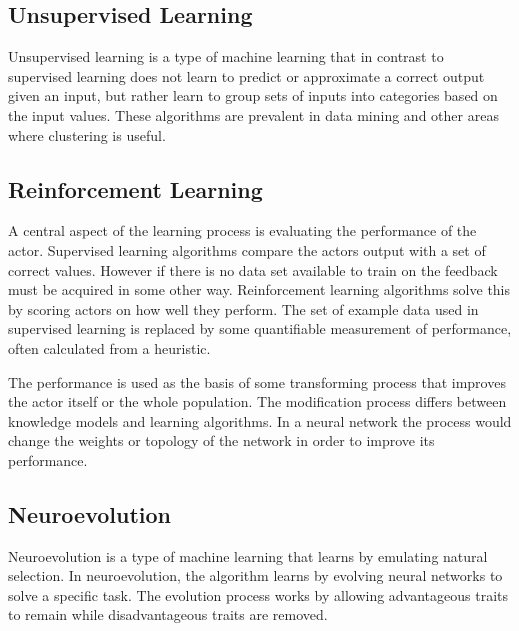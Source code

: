 
\subsection{Unsupervised Learning}
Unsupervised learning is a type of machine learning that in contrast to supervised learning does not learn to predict or approximate a correct output given an input, but rather learn to group sets of inputs into categories based on the input values. These algorithms are prevalent in data mining and other areas where clustering is useful. 

\subsection{Reinforcement Learning}
A central aspect of the learning process is evaluating the performance of the actor. Supervised learning algorithms compare the actors output with a set of correct values. However if there is no data set available to train on the feedback must be acquired in some other way. Reinforcement learning algorithms solve this by scoring actors on how well they perform. The set of example data used in supervised learning is replaced by some quantifiable measurement of performance, often calculated from a heuristic. 

The performance is used as the basis of some transforming process that improves the actor itself or the whole population. The modification process differs between knowledge models and learning algorithms. In a neural network the process would change the weights or topology of the network in order to improve its performance.

\subsection{Neuroevolution}
Neuroevolution is a type of machine learning that learns by emulating natural selection. In neuroevolution, the algorithm learns by evolving neural networks to solve a specific task. 
The evolution process works by allowing advantageous traits to remain while disadvantageous traits are removed.  

